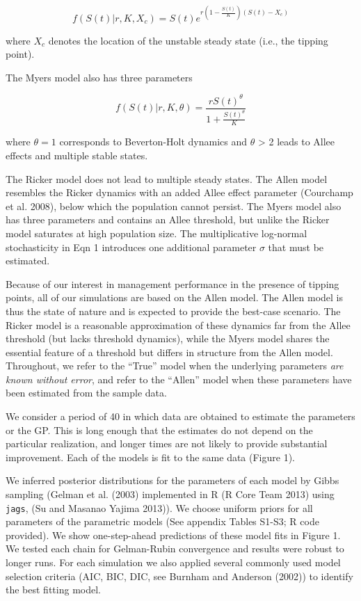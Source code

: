 \documentclass[author-year, 12pt,review]{components/elsarticle} %
\begin{document}
\begin{equation}
f(S(t)|r, K, X_c) = S(t) e^{r \left(1 - \frac{S(t)}{K}\right)\left(S(t) - X_c\right)} \label{allen}
\end{equation}

where \(X_c\) denotes the location of the unstable steady state (i.e.,
the tipping point).

The Myers model also has three parameters

\begin{equation}
f(S(t) | r, K, \theta)  = \frac{r S(t)^{\theta}}{1 + \frac{S(t)^\theta}{K}} \label{myers}
\end{equation}

where \(\theta = 1\) corresponds to Beverton-Holt dynamics and
\(\theta\) \textgreater{} 2 leads to Allee effects and multiple stable
states.

The Ricker model does not lead to multiple steady states. The Allen
model resembles the Ricker dynamics with an added Allee effect parameter
(Courchamp et al. 2008), below which the population cannot persist. The
Myers model also has three parameters and contains an Allee threshold,
but unlike the Ricker model saturates at high population size. The
multiplicative log-normal stochasticity in Eqn 1 introduces one
additional parameter \(\sigma\) that must be estimated.

Because of our interest in management performance in the presence of
tipping points, all of our simulations are based on the Allen model. The
Allen model is thus the state of nature and is expected to provide the
best-case scenario. The Ricker model is a reasonable approximation of
these dynamics far from the Allee threshold (but lacks threshold
dynamics), while the Myers model shares the essential feature of a
threshold but differs in structure from the Allen model. Throughout, we
refer to the ``True'' model when the underlying parameters \emph{are
known without error}, and refer to the ``Allen'' model when these
parameters have been estimated from the sample data.

We consider a period of 40 in which data are obtained to estimate the
parameters or the GP. This is long enough that the estimates do not
depend on the particular realization, and longer times are not likely to
provide substantial improvement. Each of the models is fit to the same
data (Figure 1).

We inferred posterior distributions for the parameters of each model by
Gibbs sampling (Gelman et al. (2003) implemented in R (R Core Team 2013)
using \texttt{jags}, (Su and Masanao Yajima 2013)). We choose uniform
priors for all parameters of the parametric models (See appendix Tables
S1-S3; R code provided). We show one-step-ahead predictions of these
model fits in Figure 1. We tested each chain for Gelman-Rubin
convergence and results were robust to longer runs. For each simulation
we also applied several commonly used model selection criteria (AIC,
BIC, DIC, see Burnham and Anderson (2002)) to identify the best fitting
model.
\end{document}
